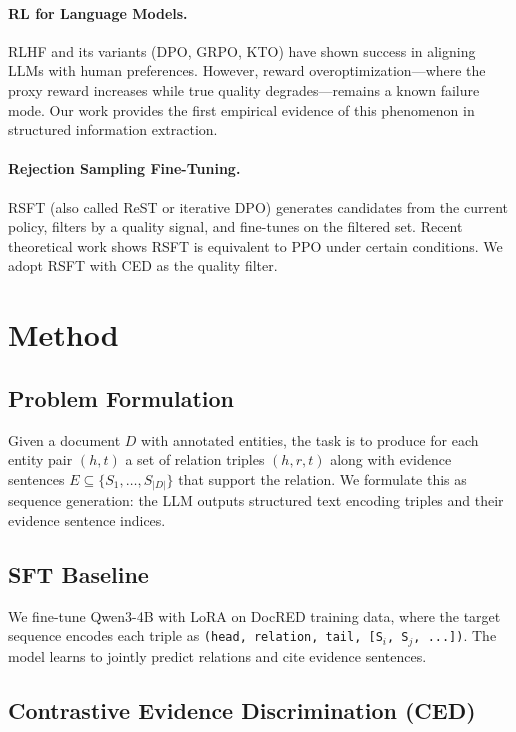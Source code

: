 \documentclass[11pt,a4paper]{article}
\newcommand{\ced}{CED}
\begin{document}
\paragraph{RL for Language Models.}
RLHF and its variants (DPO, GRPO, KTO) have shown success in aligning LLMs with human preferences. However, reward overoptimization---where the proxy reward increases while true quality degrades---remains a known failure mode. Our work provides the first empirical evidence of this phenomenon in structured information extraction.

\paragraph{Rejection Sampling Fine-Tuning.}
RSFT (also called ReST or iterative DPO) generates candidates from the current policy, filters by a quality signal, and fine-tunes on the filtered set. Recent theoretical work shows RSFT is equivalent to PPO under certain conditions. We adopt RSFT with CED as the quality filter.

\section{Method}

\subsection{Problem Formulation}

Given a document $D$ with annotated entities, the task is to produce for each entity pair $(h, t)$ a set of relation triples $(h, r, t)$ along with evidence sentences $E \subseteq \{S_1, \ldots, S_{|D|}\}$ that support the relation. We formulate this as sequence generation: the LLM outputs structured text encoding triples and their evidence sentence indices.

\subsection{SFT Baseline}

We fine-tune Qwen3-4B with LoRA on DocRED training data, where the target sequence encodes each triple as \texttt{(head, relation, tail, [S$_i$, S$_j$, ...])}. The model learns to jointly predict relations and cite evidence sentences.

\subsection{Contrastive Evidence Discrimination (\ced{})}
\label{sec:ced}
\end{document}
